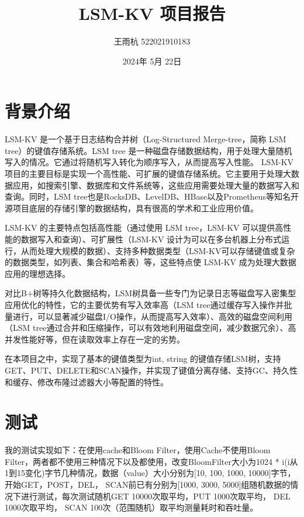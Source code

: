 \documentclass[UTF8]{article}
\title{LSM-KV 项目报告}
\author{王雨杭 522021910183}
\date{2024年 5月 22日}
\begin{document}
\maketitle

\section{背景介绍}
LSM-KV 是一个基于日志结构合并树（Log-Structured Merge-tree，简称 LSM tree）的键值存储系统。LSM tree 是一种磁盘存储数据结构，用于处理大量随机写入的情况。它通过将随机写入转化为顺序写入，从而提高写入性能。
LSM-KV 项目的主要目标是实现一个高性能、可扩展的键值存储系统。它主要用于处理大数据应用，如搜索引擎、数据库和文件系统等，这些应用需要处理大量的数据写入和查询。同时，LSM tree也是RocksDB、LevelDB、HBase以及Prometheus等知名开源项目底层的存储引擎的数据结构，具有很高的学术和工业应用价值。

LSM-KV 的主要特点包括高性能（通过使用 LSM tree，LSM-KV 可以提供高性能的数据写入和查询）、可扩展性（LSM-KV 设计为可以在多台机器上分布式运行，从而处理大规模的数据）、支持多种数据类型（LSM-KV可以存储键值或复杂的数据类型，如列表、集合和哈希表）等，这些特点使 LSM-KV 成为处理大数据应用的理想选择。

对比B+树等持久化数据结构，LSM树具备一些专门为记录日志等磁盘写入密集型应用优化的特性，它的主要优势有写入效率高（LSM tree通过缓存写入操作并批量进行，可以显著减少磁盘I/O操作，从而提高写入效率）、高效的磁盘空间利用（LSM tree通过合并和压缩操作，可以有效地利用磁盘空间，减少数据冗余）、高并发性能好等，但在读取效率上存在一定的劣势。

在本项目之中，实现了基本的键值类型为{int, string} 的键值存储LSM树，支持GET、PUT、DELETE和SCAN操作，并实现了键值分离存储、支持GC、持久性和缓存、修改布隆过滤器大小等配置的特性。



\section{测试}

我的测试实现如下：在使用cache和Bloom Filter，使用Cache不使用Bloom Filter，两者都不使用三种情况下以及都使用，改变BloomFilter大小为1024 * i(i从1到15变化)字节几种情况，数据（value）大小分别为[10, 100, 1000, 10000]字节，开始GET，POST，DEL， SCAN前已有分别为[1000, 3000, 5000]组随机数据的情况下进行测试，每次测试随机GET 10000次取平均，PUT 1000次取平均， DEL 1000次取平均， SCAN 100次（范围随机）取平均测量耗时和吞吐量。
\end{document}
